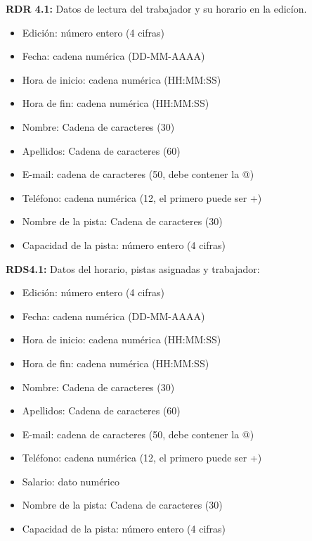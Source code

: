 \textbf{RDR 4.1:} Datos de lectura del trabajador y su horario en la edicíon.
\begin{itemize}
	\item Edición: número entero (4 cifras)
\newline
	\item Fecha: cadena numérica (DD-MM-AAAA)    
    \item Hora de inicio: cadena numérica (HH:MM:SS)
    \item Hora de fin: cadena numérica (HH:MM:SS)
\newline
	\item Nombre: Cadena de caracteres (30)
	\item Apellidos: Cadena de caracteres (60)
	\item E-mail: cadena de caracteres (50, debe contener la @)
	\item Teléfono: cadena numérica (12, el primero puede ser +)
\newline
	\item Nombre de la pista: Cadena de caracteres (30)
	\item Capacidad de la pista: número entero (4 cifras)
\end{itemize}


\textbf{RDS4.1:} Datos del horario, pistas asignadas y trabajador:
\begin{itemize}
	\item Edición: número entero (4 cifras)
\newline
	\item Fecha: cadena numérica (DD-MM-AAAA)    
    \item Hora de inicio: cadena numérica (HH:MM:SS)
    \item Hora de fin: cadena numérica (HH:MM:SS)
\newline
	\item Nombre: Cadena de caracteres (30)
	\item Apellidos: Cadena de caracteres (60)
	\item E-mail: cadena de caracteres (50, debe contener la @)
	\item Teléfono: cadena numérica (12, el primero puede ser +)
	\item Salario: dato numérico
\newline
	\item Nombre de la pista: Cadena de caracteres (30)
	\item Capacidad de la pista: número entero (4 cifras)
\end{itemize}

